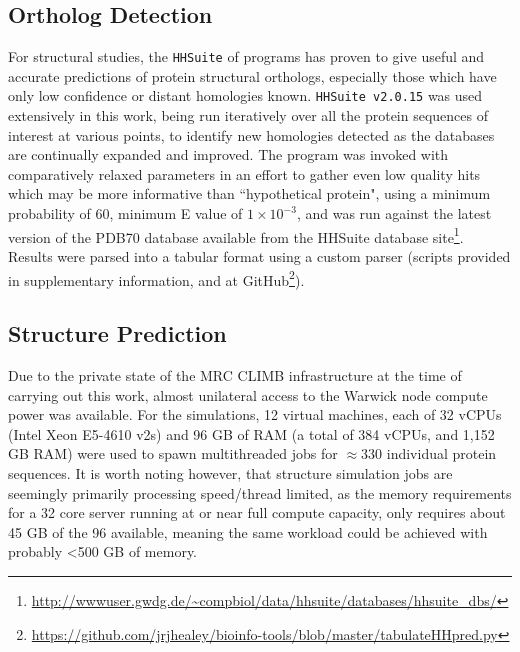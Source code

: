 \subsection{Ortholog Detection}
For structural studies, the \texttt{HHSuite} of programs has proven to give useful and accurate predictions of protein structural orthologs, especially those which have only low confidence or distant homologies known. \texttt{HHSuite v2.0.15} \citep{Remmert2012, Soding2005} was used extensively in this work, being run iteratively over all the protein sequences of interest at various points, to identify new homologies detected as the databases are continually expanded and improved. The program was invoked with comparatively relaxed parameters in an effort to gather even low quality hits which may be more informative than ``hypothetical protein", using a minimum probability of 60, minimum E value of $1\times10^{-3}$, and was run against the latest version of the PDB70 database available from the HHSuite database site\footnote{\url{http://wwwuser.gwdg.de/~compbiol/data/hhsuite/databases/hhsuite_dbs/}}. Results were parsed into a tabular format using a custom parser (scripts provided in supplementary information, and at GitHub\footnote{\url{https://github.com/jrjhealey/bioinfo-tools/blob/master/tabulateHHpred.py}}).

% 

\subsection{Structure Prediction}\label{structuresimulation}
Due to the private state of the MRC CLIMB infrastructure at the time of carrying out this work, almost unilateral access to the Warwick node compute power was available. For the simulations, 12 virtual machines, each of 32 vCPUs (Intel Xeon E5-4610 v2s) and 96 GB of RAM (a total of 384 vCPUs, and 1,152 GB RAM) were used to spawn multithreaded jobs for $\approx$330 individual protein sequences. It is worth noting however, that structure simulation jobs are seemingly primarily processing speed/thread limited, as the memory requirements for a 32 core server running at or near full compute capacity, only requires about 45 GB of the 96 available, meaning the same workload could be achieved with probably \textless 500 GB of memory.

